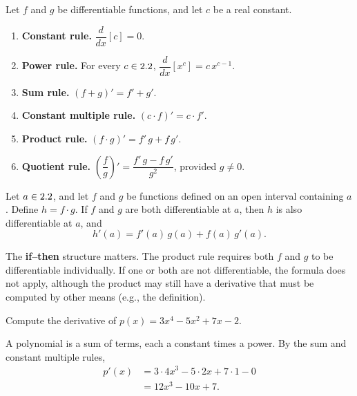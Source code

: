 \begin{theorem}
\label{thm:3-1}
Let $f$ and $g$ be differentiable functions, and let $c$ be a real constant.
\begin{enumerate}[label=(\roman*)]
  \item \textbf{Constant rule.} $\dfrac{d}{dx}[c] = 0$.
  \item \textbf{Power rule.} For every $c \in 2.2$, $\dfrac{d}{dx}\!\left[x^{c}\right] = c\,x^{c-1}$.
  \item \textbf{Sum rule.} $(f + g)' = f' + g'$.
  \item \textbf{Constant multiple rule.} $(c \cdot f)' = c \cdot f'$.
  \item \textbf{Product rule.} $(f \cdot g)' = f'\,g + f\,g'$.
  \item \textbf{Quotient rule.} $\left(\dfrac{f}{g}\right)' = \dfrac{f'\,g - f\,g'}{g^{2}}$, \quad provided $g \neq 0$.
\end{enumerate}
\end{theorem}

\begin{theorem}
\label{thm:3-2}
Let $a \in 2.2$, and let $f$ and $g$ be functions defined on an open interval containing $a$.  Define $h = f \cdot g$.  If $f$ and $g$ are both differentiable at $a$, then $h$ is also differentiable at $a$, and
\[
  h'(a) = f'(a)\,g(a) + f(a)\,g'(a).
\]
\end{theorem}

\begin{remark}[Warning]
The \textbf{if--then} structure matters.  The product rule requires both $f$ and $g$ to be differentiable individually.  If one or both are not differentiable, the formula does not apply, although the product may still have a derivative that must be computed by other means (e.g., the definition).
\end{remark}

\begin{example}
\label{ex:3-3}
Compute the derivative of $p(x) = 3x^{4} - 5x^{2} + 7x - 2$.

A polynomial is a sum of terms, each a constant times a power.  By the sum and constant multiple rules,
\begin{align*}
  p'(x)
  &= 3 \cdot 4x^{3} - 5 \cdot 2x + 7 \cdot 1 - 0 \\
  &= 12x^{3} - 10x + 7.
\end{align*}
\end{example}

